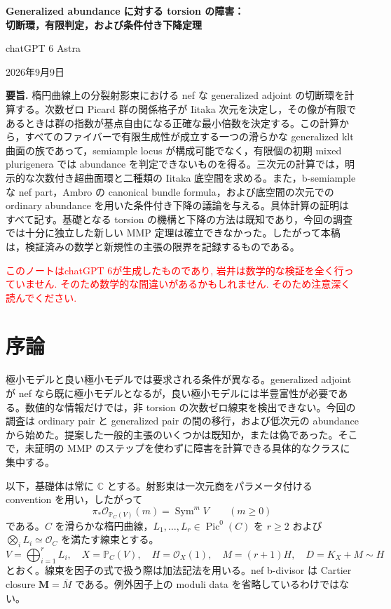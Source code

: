 \documentclass[12pt]{amsart}
\newcommand{\StartJapanese}{\normalfont}
\theoremstyle{definition}
\theoremstyle{remark}
\numberwithin{equation}{section}
\newcommand{\cO}{\mathcal{O}}
\DeclareMathOperator{\Sym}{Sym}
\newcommand{\C}{\mathbb{C}}
\newcommand{\mP}{\mathbb{P}}
\newcommand{\xr}[1]{\textcolor{red}{#1}}
\DeclareMathOperator{\Pic}{Pic}
\newcommand{\bM}{\mathbf M}
\begin{document}
\newpage
\StartJapanese
\setcounter{section}{0}
\setcounter{thm}{0}
\setcounter{equation}{0}
\renewcommand{\theHsection}{ja.\arabic{section}}
\renewcommand{\theHequation}{ja.\thesection.\arabic{equation}}
\renewcommand{\theHthm}{ja.\thesection.\arabic{thm}}
\begin{center}
{\Large\bfseries Generalized abundance に対する torsion の障害：\\
切断環，有限判定，および条件付き下降定理}\par\medskip
chatGPT 6 Astra\par\smallskip
2026年9月9日
\end{center}
\noindent\textbf{要旨.}
楕円曲線上の分裂射影束における nef な generalized adjoint の切断環を計算する。次数ゼロ Picard 群の関係格子が Iitaka 次元を決定し，その像が有限であるときは群の指数が基点自由になる正確な最小倍数を決定する。この計算から，すべてのファイバーで有限生成性が成立する一つの滑らかな generalized klt 曲面の族であって，semiample locus が構成可能でなく，有限個の初期 mixed plurigenera では abundance を判定できないものを得る。三次元の計算では，明示的な次数付き超曲面環と二種類の Iitaka 底空間を求める。また，b-semiample な nef part，Ambro の canonical bundle formula，および底空間の次元での ordinary abundance を用いた条件付き下降の議論を与える。具体計算の証明はすべて記す。基礎となる torsion の機構と下降の方法は既知であり，今回の調査では十分に独立した新しい MMP 定理は確立できなかった。したがって本稿は，検証済みの数学と新規性の主張の限界を記録するものである。

\xr{このノートはchatGPT 6が生成したものであり, 岩井は数学的な検証を全く行っていません. そのため数学的な間違いがあるかもしれません. そのため注意深く読んでください.}

\section{序論}\label{ja:intro}
極小モデルと良い極小モデルでは要求される条件が異なる。generalized adjoint が nef なら既に極小モデルとなるが，良い極小モデルには半豊富性が必要である。数値的な情報だけでは，非 torsion の次数ゼロ線束を検出できない。今回の調査は ordinary pair と generalized pair の間の移行，および低次元の abundance から始めた。提案した一般的主張のいくつかは既知か，または偽であった。そこで，未証明の MMP のステップを使わずに障害を計算できる具体的なクラスに集中する。

以下，基礎体は常に $\C$ とする。射影束は一次元商をパラメータ付ける convention を用い，したがって
\[
 \pi_*\cO_{\mP_C(V)}(m)=\Sym^mV\qquad(m\geq0)
\]
である。$C$ を滑らかな楕円曲線，$L_1,\ldots,L_r\in\Pic^0(C)$ を $r\geq2$ および $\bigotimes_iL_i\simeq\cO_C$ を満たす線束とする。
\begin{equation}\label{ja:setup}
 V=\bigoplus_{i=1}^rL_i,\quad X=\mP_C(V),\quad
 H=\cO_X(1),\quad M=(r+1)H,\quad D=K_X+M\sim H
\end{equation}
とおく。線束を因子の式で扱う際は加法記法を用いる。nef b-divisor は Cartier closure $\bM=\overline M$ である。例外因子上の moduli data を省略しているわけではない。
\end{document}
